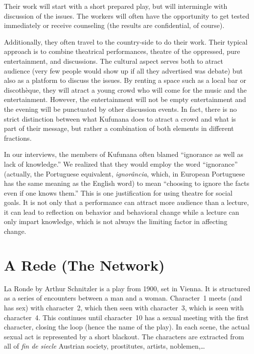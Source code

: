 \documentclass[article,twocolumn]{memoir}
\begin{document}
Their work will start with a short prepared play, but will intermingle with
discussion of the issues. The workers will often have the opportunity to get
tested immediately or receive counseling (the results are confidential, of
course).

Additionally, they often travel to the country-side to do their work. Their
typical approach is to combine theatrical performances, theatre of the
oppressed, pure entertainment, and discussions. The cultural aspect serves both
to atract audience (very few people would show up if all they advertised was
debate) but also as a platform to discuss the issues. By renting a space such
as a local bar or discothèque, they will atract a young crowd who will come for
the music and the entertainment. However, the entertainment will not be empty
entertainment and the evening will be punctuated by other discussion events. In
fact, there is no strict distinction between what Kufunana does to atract a
crowd and what is part of their message, but rather a combination of both
elements in different fractions.

In our interviews, the members of Kufunana often blamed ``ignorance as well as
lack of knowledge.'' We realized that they would employ the word ``ignorance''
(actually, the Portuguese equivalent, \textit{ignor\^{a}ncia}, which, in
European Portuguese has the same meaning as the English word) to mean
``choosing to ignore the facts even if one knows them.'' This is one
justification for using theatre for social goals. It is not only that a
performance can attract more audience than a lecture, it can lead to reflection
on behavior and behavioral change while a lecture can only impart knowledge,
which is not always the limiting factor in affecting change.

\chapter{A Rede (The Network)}
La Ronde by Arthur Schnitzler is a play from 1900, set in Vienna. It is
structured as a series of encounters between a man and a woman. Character~1
meets (and has sex) with character~2, which then seen with character~3, which
is seen with character~4. This continues until character~10 has a sexual
meeting with the first character, closing the loop (hence the name of the
play). In each scene, the actual sexual act is represented by a short blackout.
The characters are extracted from all of \textit{fin de siecle} Austrian
society, prostitutes, artists, noblemen,\ldots
\end{document}
